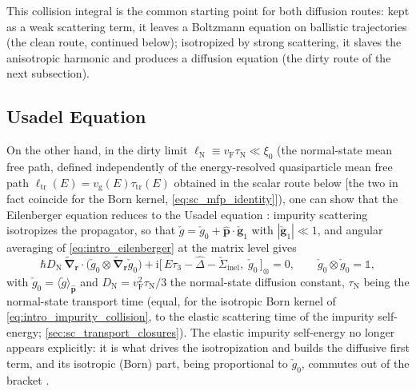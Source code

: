 \documentclass[
  aps,
  prb,
  preprint,
  superscriptaddress,
  longbibliography,
  nofootinbib
]{revtex4-2}
\newcommand{\ii}{\mathrm{i}}
\newcommand{\br}{\mathbf{r}}
\newcommand{\bp}{\mathbf{p}}
\newcommand{\bnabla}{\boldsymbol{\nabla}}
\newcommand{\vF}{v_{\mathrm{F}}}
\newcommand{\vg}{v_{\mathrm{g}}}
\newcommand{\tautr}{\tau_{\mathrm{tr}}}
\newcommand{\elltr}{\ell_{\mathrm{tr}}}
\newcommand{\DN}{D_{\mathrm{N}}}
\newcommand{\checkg}{\check{g}}
\newcommand{\hatD}{\hat{\Delta}}
\providecommand{\openone}{}\renewcommand{\openone}{\mathds{1}}
\begin{document}
This collision integral is the common starting point for both diffusion
routes: kept as a weak scattering term, it leaves a Boltzmann equation
on ballistic trajectories (the clean route, continued below);
isotropized by strong scattering, it slaves the anisotropic harmonic
and produces a diffusion equation (the dirty route of the next
subsection).

\subsection{Usadel Equation}

On the other hand, in the dirty limit
\(\ell_{\mathrm N}\equiv\vF\tau_{\mathrm N}\ll\xi_0\) (the normal-state
mean free path, defined independently of the energy-resolved
quasiparticle mean free path \(\elltr(E)=\vg(E)\tautr(E)\) obtained in
the scalar route below [the two in fact
coincide for the Born kernel, \cref{eq:sc_mfp_identity}]), one can show
that the Eilenberger equation reduces to the Usadel equation
\cite{usadel1970,kopnin2001}: impurity scattering isotropizes the
propagator, so that
\(\checkg=\checkg_0+\hat{\bp}\cdot\check{\mathbf{g}}_1\) with
\(|\check{\mathbf{g}}_1|\ll1\), and angular averaging of
\cref{eq:intro_eilenberger} at the matrix level gives
\begin{equation}
  \hbar\DN\,
  \widetilde{\bnabla}_{\br}\!\cdot\!
  \bigl(
    \checkg_{0}\otimes\widetilde{\bnabla}_{\br}\checkg_{0}
  \bigr)
  +
  \ii\bigl[\,E\tau_3-\hatD-\check{\Sigma}_{\mathrm{inel}},\;\checkg_{0}\,\bigr]_{\otimes}
  =
  0,
  \qquad
  \checkg_{0}\otimes\checkg_{0}=\openone,
  \label{eq:intro_usadel_matrix}
\end{equation}
with \(\checkg_{0}=\langle\checkg\rangle_{\hat{\bp}}\) and
\(\DN=\vF^{2}\tau_{\mathrm{N}}/3\) the normal-state diffusion
constant, \(\tau_{\mathrm{N}}\) being the normal-state transport
time (equal, for the isotropic Born kernel of
\cref{eq:intro_impurity_collision}, to the elastic scattering time of
the impurity self-energy; \cref{sec:sc_transport_closures}). The elastic impurity self-energy no longer appears explicitly: it is what
drives the isotropization and builds the diffusive first term, and its
isotropic (Born) part, being proportional to \(\checkg_{0}\), commutes
out of the bracket \cite{usadel1970,belzig1999}.
\end{document}
